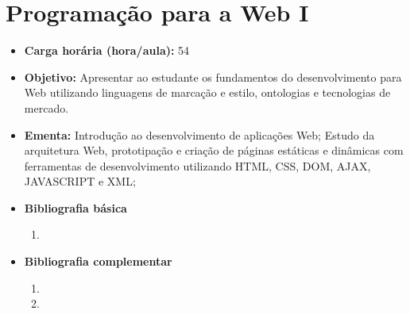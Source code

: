 \documentclass[11pt,fleqn]{book} %
\begin{document}


\newpage
\section{Programação para a Web I}\label{4_ppw1}
\begin{itemize}
	\item \textbf{Carga horária (hora/aula):} 54
	\item \textbf{Objetivo:} Apresentar ao estudante os fundamentos do desenvolvimento para Web utilizando linguagens de marcação e estilo, ontologias e tecnologias de mercado.
	\item \textbf{Ementa:} 
	Introdução ao desenvolvimento de aplicações Web;
	Estudo da arquitetura Web, prototipação e criação de páginas estáticas e dinâmicas com ferramentas de desenvolvimento utilizando HTML, CSS, DOM, AJAX, JAVASCRIPT e XML;
	\item \textbf{Bibliografia básica}
	\begin{enumerate}
		\item 
	\end{enumerate}
	\item \textbf{Bibliografia complementar}
	\begin{enumerate}
		\item
		\item 
	\end{enumerate}
\end{itemize}


\newpage
\end{document}
